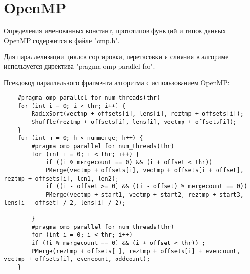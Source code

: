 \documentclass{report}
\begin{document}
\section*{OpenMP}
Определения именованных констант, прототипов функций и типов данных OpenMP содержится в файле "omp.h".
\par Для параллелизации циклов сортировки, перетасовки и слияния в алгориме используется директива "pragma omp parallel for".
\par Псевдокод параллельного фрагмента алгоритма с использованием OpenMP:
\begin{lstlisting}
	#pragma omp parallel for num_threads(thr)
	for (int i = 0; i < thr; i++) {
		RadixSort(vectmp + offsets[i], lens[i], reztmp + offsets[i]);
		Shuffle(reztmp + offsets[i], lens[i], vectmp + offsets[i]);
	}
	for (int h = 0; h < nummerge; h++) {
		#pragma omp parallel for num_threads(thr)
		for (int i = 0; i < thr; i++) {
			if ((i % mergecount == 0) && (i + offset < thr))
			PMerge(vectmp + offsets[i], vectmp + offsets[i + offset], reztmp + offsets[i], len1, len2);
			if ((i - offset >= 0) && ((i - offset) % mergecount == 0)) 
			PMerge(vectmp + start1, vectmp + start2, reztmp + start3, lens[i - offset] / 2, lens[i] / 2);
			
		}
		#pragma omp parallel for num_threads(thr)
		for (int i = 0; i < thr; i++)
		if ((i % mergecount == 0) && (i + offset < thr)) ;
		PMerge(reztmp + offsets[i], reztmp + offsets[i] + evencount, vectmp + offsets[i], evencount, oddcount);
	}
\end{lstlisting}
\newpage

\end{document}

